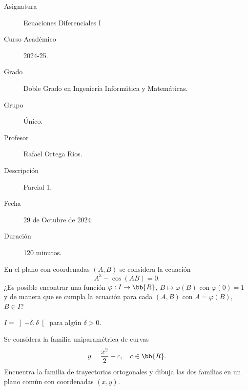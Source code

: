 \documentclass[12pt]{article}
\begin{document}

    
    

    \begin{description}
        \item[Asignatura] Ecuaciones Diferenciales I
        \item[Curso Académico] 2024-25.
        \item[Grado] Doble Grado en Ingeniería Informática y Matemáticas.
        \item[Grupo] Único.
        \item[Profesor] Rafael Ortega Ríos.
        \item[Descripción] Parcial 1.
        \item[Fecha] 29 de Octubre de 2024.
        \item[Duración] 120 minutos.
    
    \end{description}
    \newpage

    \begin{ejercicio}
        En el plano con coordenadas $(A, B)$ se considera la ecuación
        \begin{equation*}
            A^3 - \cos(AB) = 0.
        \end{equation*}
        ¿Es posible encontrar una función $\varphi : I \to \bb{R}$, $B \mapsto \varphi(B)$ con $\varphi(0) = 1$ y de manera que se cumpla la ecuación para cada $(A, B)$ con $A = \varphi(B)$, $B \in I$?
        
        $I = \left] - \delta, \delta\right[$ para algún $\delta > 0$.
    \end{ejercicio}

    \begin{ejercicio}
        Se considera la familia uniparamétrica de curvas
        \begin{equation*}
            y = \dfrac{x^2}{2} + c, \quad c \in \bb{R}.
        \end{equation*}
        Encuentra la familia de trayectorias ortogonales y dibuja las dos familias en un plano común con coordenadas $(x, y)$.
    \end{ejercicio}
\end{document}

